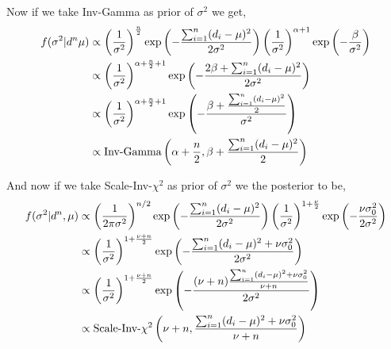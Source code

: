 \begin{example}
    Now if we take Inv-Gamma as prior of $ \sigma^{2} $ we get,
    \begin{align*}
        f(\sigma^{2}|d^{n} \mu) &\propto \left(\frac{ 1 }{\sigma^{2}}\right)^{\frac{ n }{2}} \exp \left( - \frac{ \sum_{i=1}^{n} (d_i - \mu)^{2} }{ 2 \sigma^{2} } \right) 
        \left( \frac{ 1 }{ \sigma^{2} }\right)^{\alpha+1}  \exp \left( - \frac{ \beta }{ \sigma^{2}  } \right) \\ 
                                &\propto \left( \frac{ 1 }{ \sigma^{2} } \right)^{\alpha + \frac{ n }{ 2 } + 1} 
                                \exp \left( - \frac{ 2\beta + \sum_{i=1}^{n} (d_i-\mu)^{2} }{ 2\sigma^{2} } \right) \\ 
                                &\propto \left( \frac{ 1 }{ \sigma^{2} } \right)^{\alpha + \frac{ n }{ 2 } + 1}
                                \exp \left( - \frac{ \beta + \frac{ \sum_{i=1}^{n} (d_i-\mu)^{2} }{ 2 } }{ \sigma^{2} } \right) \\ 
                                &\propto \text{Inv-Gamma}\left( \alpha + \frac{ n }{ 2 }, \beta + \frac{ \sum_{i=1}^{n} (d_i-\mu)^{2} }{ 2 } \right)
    \end{align*}

    And now if we take Scale-Inv-$ \chi^{2} $ as prior of $ \sigma^{2} $ we the posterior to be,
    \begin{align*}
        f(\sigma^{2}|d^{n} ,\mu) &\propto \left( \frac{ 1 }{ 2 \pi \sigma^{2} } \right)^{n/2} 
        \exp \left( - \frac{ \sum_{i=1}^{n} (d_i - \mu)^{2} }{ 2 \sigma^{2} } \right) 
        \left( \frac{ 1 }{ \sigma^{2} } \right)^{1+\frac{ \nu }{ 2 }}
        \exp \left( - \frac{ \nu \sigma_0^{2} }{ 2 \sigma^{2} } \right) \\ 
                                 &\propto \left( \frac{ 1 }{ \sigma^{2} } \right)^{1+\frac{ \nu+ n }{ 2 }} 
        \exp \left( - \frac{ \sum_{i=1}^{n}(d_i-\mu)^{2} + \nu \sigma_0^{2}  }{ 2 \sigma^{2} } \right) \\ 
                                 &\propto \left( \frac{ 1 }{ \sigma^{2} } \right)^{1+\frac{ \nu+ n }{ 2 }} 
                                 \exp \left( - \frac{ (\nu + n) \frac{ \sum_{i=1}^{n}(d_i-\mu)^{2} + \nu \sigma_0^{2} }{ \nu + n } }{ 2 \sigma^{2} } \right) \\ 
                                 &\propto \text{Scale-Inv-}\chi^{2}\left( \nu + n, \frac{ \sum_{i=1}^{n}(d_i-\mu)^{2} + \nu \sigma_0^{2} }{ \nu + n } \right)
    \end{align*}

 \end{example}


